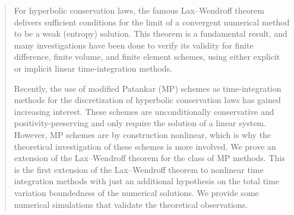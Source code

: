 \documentclass[final,11pt, times, linenumber, nopreprintline]{elsarticle}
\newcommand{\todo}[1]{{\Large \textcolor{red}{#1}}}
\newcommand{\TI}[1]{{\color{red}#1}}
\begin{document}
\begin{frontmatter}
\begin{abstract}
For hyperbolic conservation laws, the famous Lax--Wendroff theorem delivers sufficient conditions for the limit of a convergent numerical method to be a weak (entropy) solution.
This theorem is a fundamental result, and many investigations have been done to verify its validity for finite difference, finite volume, and finite element schemes, using either explicit or implicit linear time-integration methods.

Recently, the use of modified Patankar (MP) schemes as time-integration methods for the discretization of hyperbolic conservation laws has gained increasing interest. These schemes are unconditionally conservative and positivity-preserving and only require the solution of a linear system. However, MP schemes are by construction nonlinear, which is why the theoretical investigation of these schemes is more involved. 
We prove an extension of the Lax--Wendroff theorem for the class of MP methods. This is the first extension of the Lax--Wendroff theorem to nonlinear time integration methods with just an additional hypothesis on the total time variation boundedness of the numerical solutions. We provide some numerical simulations that validate the theoretical observations.




\end{abstract}
\end{frontmatter}
\end{document}
